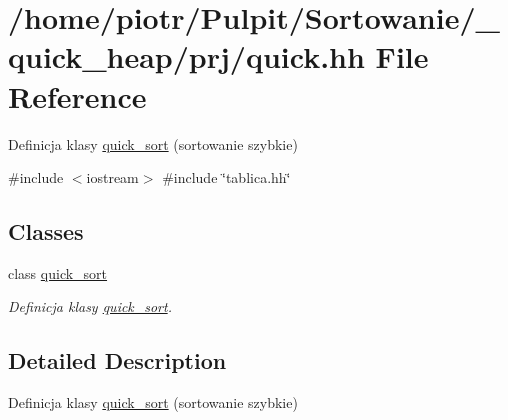 \hypertarget{quick_8hh}{\section{/home/piotr/\-Pulpit/\-Sortowanie/\-\_\-quick\-\_\-heap/prj/quick.hh \-File \-Reference}
\label{quick_8hh}
}


\-Definicja klasy \hyperlink{classquick__sort}{quick\-\_\-sort} (sortowanie szybkie)  


{\ttfamily \#include $<$iostream$>$}\*
{\ttfamily \#include \char`\"{}tablica.\-hh\char`\"{}}\*
\subsection*{\-Classes}
\begin{DoxyCompactItemize}
\item 
class \hyperlink{classquick__sort}{quick\-\_\-sort}
\begin{DoxyCompactList}\small\item\em \-Definicja klasy \hyperlink{classquick__sort}{quick\-\_\-sort}. \end{DoxyCompactList}\end{DoxyCompactItemize}


\subsection{\-Detailed \-Description}
\-Definicja klasy \hyperlink{classquick__sort}{quick\-\_\-sort} (sortowanie szybkie) 